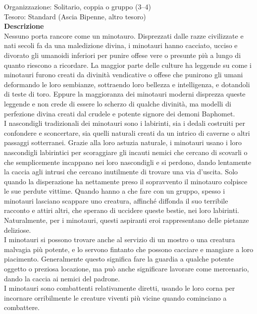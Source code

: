 \begin{multicols}{2}
Organizzazione: Solitario, coppia o gruppo (3–4)\\
Tesoro: Standard (Ascia Bipenne, altro tesoro)\\
\textbf{Descrizione}\\
Nessuno porta rancore come un minotauro. Disprezzati dalle razze civilizzate e nati secoli fa da una maledizione divina, i minotauri hanno cacciato, ucciso e divorato gli umanoidi inferiori per punire offese vere o presunte più a lungo di quanto riescono a ricordare. La maggior parte delle culture ha leggende su come i minotauri furono creati da divinità vendicative o offese che punirono gli umani deformando le loro sembianze, sottraendo loro bellezza e intelligenza, e dotandoli di teste di toro. Eppure la maggioranza dei minotauri moderni disprezza queste leggende e non crede di essere lo scherzo di qualche divinità, ma modelli di perfezione divina creati dal crudele e potente signore dei demoni Baphomet.\\
I nascondigli tradizionali dei minotauri sono i labirinti, sia i dedali costruiti per confondere e sconcertare, sia quelli naturali creati da un intrico di caverne o altri passaggi sotterranei. Grazie alla loro astuzia naturale, i minotauri usano i loro nascondigli labirintici per scoraggiare gli incauti nemici che cercano di scovarli o che semplicemente incappano nei loro nascondigli e si perdono, dando lentamente la caccia agli intrusi che cercano inutilmente di trovare una via d’uscita. Solo quando la disperazione ha nettamente preso il sopravvento il minotauro colpisce le sue perdute vittime. Quando hanno a che fare con un gruppo, spesso i minotauri lasciano scappare uno creatura, affinché diffonda il suo terribile racconto e attiri altri, che sperano di uccidere queste bestie, nei loro labirinti. Naturalmente, per i minotauri, questi aspiranti eroi rappresentano delle pietanze deliziose.\\
I minotauri si possono trovare anche al servizio di un mostro o una creatura malvagia più potente, e lo servono fintanto che possono cacciare e mangiare a loro piacimento. Generalmente questo significa fare la guardia a qualche potente oggetto o preziosa locazione, ma può anche significare lavorare come mercenario, dando la caccia ai nemici del padrone.\\
I minotauri sono combattenti relativamente diretti, usando le loro corna per incornare orribilmente le creature viventi più vicine quando cominciano a combattere.\\


\end{multicols}
